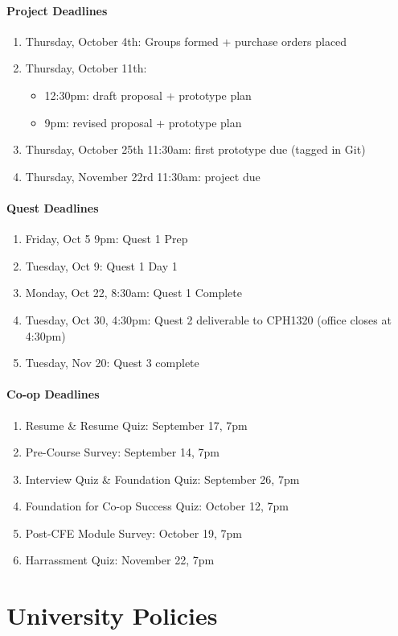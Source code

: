 \documentclass[11pt,onecolumn]{article}
\newcommand{\bi}{\begin{itemize}}
\newcommand{\ei}{\end{itemize}}
\newcommand{\be}{\begin{enumerate}}
\newcommand{\ee}{\end{enumerate}}
\newcommand{\biTight}{\vspace{-\parskip}\bi\setlength{\itemsep}{0pt}\setlength{\parskip}{0pt} }
\newcommand{\beTight}{\vspace{-\parskip}\be\setlength{\itemsep}{0pt}\setlength{\parskip}{0pt} }
\begin{document}
\paragraph{Project Deadlines}
\beTight
    \item Thursday, October 4th: Groups formed + purchase orders
    placed
    \item Thursday, October 11th: 
        \biTight
            \item 12:30pm: draft proposal + prototype plan
            \item 9pm: revised proposal + prototype plan
        \ei
    \item Thursday, October 25th 11:30am: first prototype due (tagged in Git)
    \item Thursday, November 22rd 11:30am: project due
\ee

\paragraph{Quest Deadlines}

\beTight
    \item Friday, Oct 5 9pm: Quest 1 Prep
    \item Tuesday, Oct 9: Quest 1 Day 1
    \item Monday, Oct 22, 8:30am: Quest 1 Complete
    \item Tuesday, Oct 30, 4:30pm: Quest 2 deliverable to CPH1320 (office closes at 4:30pm)
    \item Tuesday, Nov 20: Quest 3 complete
\ee


\paragraph{Co-op Deadlines}

\beTight
    \item Resume \& Resume Quiz: September 17, 7pm
    \item Pre-Course Survey: September 14, 7pm
    \item Interview Quiz \& Foundation Quiz: September 26, 7pm
    \item Foundation for Co-op Success Quiz: October 12, 7pm
    \item Post-CFE Module Survey: October 19, 7pm
    \item Harrassment Quiz: November 22, 7pm
\ee



\section{University Policies}
\end{document}
